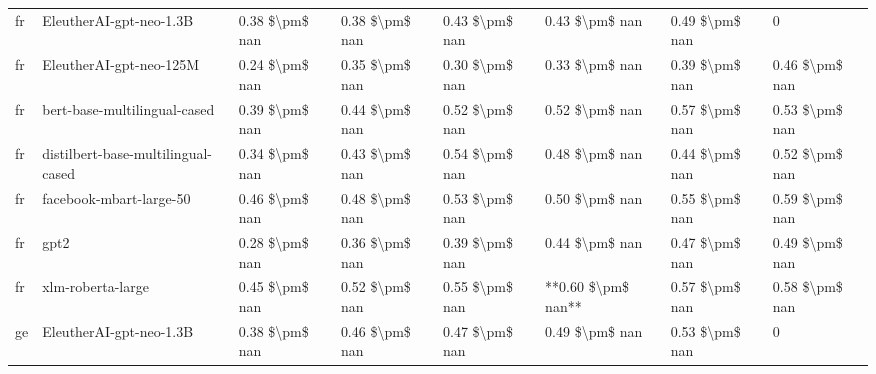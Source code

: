 \begin{tabular}{llllllll}
      fr &            EleutherAI-gpt-neo-1.3B & 0.38 \$\textbackslash pm\$ nan &            0.38 \$\textbackslash pm\$ nan &        0.43 \$\textbackslash pm\$ nan &         0.43 \$\textbackslash pm\$ nan &                          0.49 \$\textbackslash pm\$ nan &                  0 \\
      fr &            EleutherAI-gpt-neo-125M & 0.24 \$\textbackslash pm\$ nan &            0.35 \$\textbackslash pm\$ nan &        0.30 \$\textbackslash pm\$ nan &         0.33 \$\textbackslash pm\$ nan &                          0.39 \$\textbackslash pm\$ nan &     0.46 \$\textbackslash pm\$ nan \\
      fr &       bert-base-multilingual-cased & 0.39 \$\textbackslash pm\$ nan &            0.44 \$\textbackslash pm\$ nan &        0.52 \$\textbackslash pm\$ nan &         0.52 \$\textbackslash pm\$ nan &                          0.57 \$\textbackslash pm\$ nan &     0.53 \$\textbackslash pm\$ nan \\
      fr & distilbert-base-multilingual-cased & 0.34 \$\textbackslash pm\$ nan &            0.43 \$\textbackslash pm\$ nan &        0.54 \$\textbackslash pm\$ nan &         0.48 \$\textbackslash pm\$ nan &                          0.44 \$\textbackslash pm\$ nan &     0.52 \$\textbackslash pm\$ nan \\
      fr &            facebook-mbart-large-50 & 0.46 \$\textbackslash pm\$ nan &            0.48 \$\textbackslash pm\$ nan &        0.53 \$\textbackslash pm\$ nan &         0.50 \$\textbackslash pm\$ nan &                          0.55 \$\textbackslash pm\$ nan &     0.59 \$\textbackslash pm\$ nan \\
      fr &                               gpt2 & 0.28 \$\textbackslash pm\$ nan &            0.36 \$\textbackslash pm\$ nan &        0.39 \$\textbackslash pm\$ nan &         0.44 \$\textbackslash pm\$ nan &                          0.47 \$\textbackslash pm\$ nan &     0.49 \$\textbackslash pm\$ nan \\
      fr &                  xlm-roberta-large & 0.45 \$\textbackslash pm\$ nan &            0.52 \$\textbackslash pm\$ nan &        0.55 \$\textbackslash pm\$ nan &     **0.60 \$\textbackslash pm\$ nan** &                          0.57 \$\textbackslash pm\$ nan &     0.58 \$\textbackslash pm\$ nan \\
      ge &            EleutherAI-gpt-neo-1.3B & 0.38 \$\textbackslash pm\$ nan &            0.46 \$\textbackslash pm\$ nan &        0.47 \$\textbackslash pm\$ nan &         0.49 \$\textbackslash pm\$ nan &                          0.53 \$\textbackslash pm\$ nan &                  0 \\

\end{tabular}
